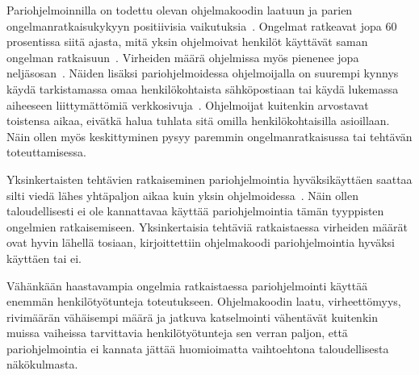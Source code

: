 \documentclass[finnish]{tktltiki2}
\theoremstyle{definition}
\theoremstyle{remark}
\begin{document}
Pariohjelmoinnilla on todettu olevan ohjelmakoodin laatuun ja parien ongelmanratkaisukykyyn positiivisia vaikutuksia~\cite{pairprogramming}. Ongelmat ratkeavat jopa 60 prosentissa siitä ajasta, mitä yksin ohjelmoivat henkilöt käyttävät saman ongelman ratkaisuun~\cite{meta}. Virheiden määrä ohjelmissa myös pienenee jopa neljäsosan~\cite{williams00str}. Näiden lisäksi pariohjelmoidessa ohjelmoijalla on suurempi kynnys käydä tarkistamassa omaa henkilökohtaista sähköpostiaan tai käydä lukemassa aiheeseen liittymättömiä verkkosivuja~\cite{williams03pair}. Ohjelmoijat kuitenkin arvostavat toistensa aikaa, eivätkä halua tuhlata sitä omilla henkilökohtaisilla asioillaan. Näin ollen myös keskittyminen pysyy paremmin ongelmanratkaisussa tai tehtävän toteuttamisessa.

Yksinkertaisten tehtävien ratkaiseminen pariohjelmointia hyväksikäyttäen saattaa silti viedä lähes yhtäpaljon aikaa kuin yksin ohjelmoidessa~\cite{meta}. Näin ollen taloudellisesti ei ole kannattavaa käyttää pariohjelmointia tämän tyyppisten ongelmien ratkaisemiseen. Yksinkertaisia tehtäviä ratkaistaessa virheiden määrät ovat hyvin lähellä tosiaan, kirjoittettiin ohjelmakoodi pariohjelmointia hyväksi käyttäen tai ei.

Vähänkään haastavampia ongelmia ratkaistaessa pariohjelmointi käyttää enemmän henkilötyötunteja toteutukseen. Ohjelmakoodin laatu, virheettömyys, rivimäärän vähäisempi määrä ja jatkuva katselmointi vähentävät kuitenkin muissa vaiheissa tarvittavia henkilötyötunteja sen verran paljon, että pariohjelmointia ei kannata jättää huomioimatta vaihtoehtona taloudellisesta näkökulmasta.


%
%
% 
%



\end{document}
